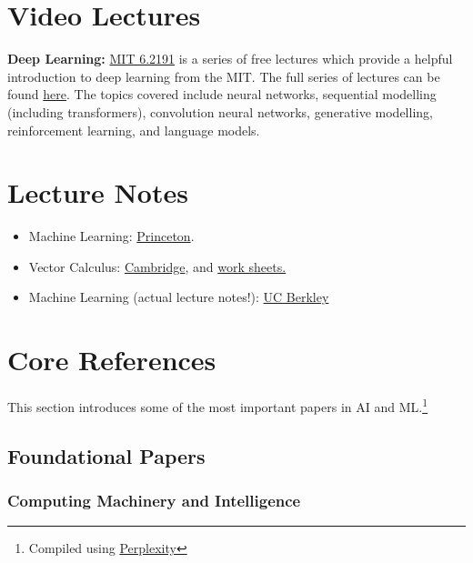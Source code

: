\documentclass{article}
\begin{document}
\section{Video Lectures}

\textbf{Deep Learning: }\href{http://introtodeeplearning.com/}{MIT 6.2191} is a series of free lectures which provide a helpful introduction to deep learning from the MIT. The full series of lectures can be found \href{https://www.youtube.com/playlist?list=PLtBw6njQRU-rwp5__7C0oIVt26ZgjG9NI}{here}. The topics covered include neural networks, sequential modelling (including transformers), convolution neural networks, generative modelling, reinforcement learning, and language models. 

\section{Lecture Notes}
\begin{itemize}
    \item Machine Learning: \href{https://princeton-introml.github.io/files/COS324_Course_Notes.pdf}{Princeton}.
    \item Vector Calculus: \href{https://www.damtp.cam.ac.uk/user/tong/vc/vc.pdf}{Cambridge}, and \href{https://www.damtp.cam.ac.uk/user/tong/vc.html}{work sheets.}
    \item Machine Learning (actual lecture notes!): \href{https://people.eecs.berkeley.edu/~jrs/papers/machlearn.pdf}{UC Berkley}
\end{itemize}

\section{Core References}

This section introduces some of the most important papers in AI and ML.\footnote{Compiled using \href{https://www.perplexity.ai/search/i-want-a-list-of-the-most-impo-XR\_jbWnpQtqxWLKwizn6uQ\#0}{Perplexity}}

\subsection{Foundational Papers}

\subsubsection*{Computing Machinery and Intelligence}
\end{document}
